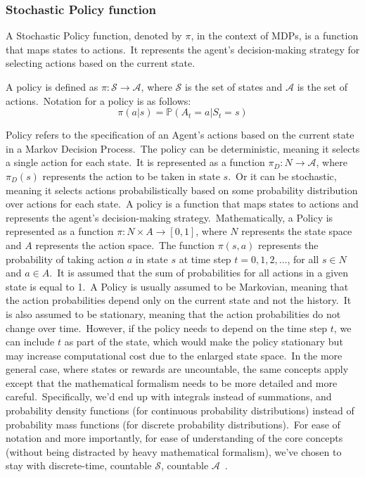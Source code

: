 \documentclass[../xlapes02]{subfiles}
\begin{document}
    \subsubsection{Stochastic Policy function}\label{subsubsec:policy}
    A Stochastic Policy function, denoted by $\pi$, in the context of MDPs, is a function that maps states to actions.\ It represents the agent's decision-making strategy for selecting actions based on the current state.
    \begin{definition}
        A policy is defined as $\pi: \mathcal{S} \rightarrow \mathcal{A}$, where $\mathcal{S}$ is the set of states and $\mathcal{A}$ is the set of actions.\ Notation for a policy is as follows:
        \begin{equation}
            \label{eq:policy}
            \pi(a|s)=\mathbb{P}(A_t=a|S_t=s)
        \end{equation}
    \end{definition}
    Policy refers to the specification of an Agent's actions based on the current state in a Markov Decision Process.\ The policy can be deterministic, meaning it selects a single action for each state.\ It is represented as a function $\pi_D : N \rightarrow \mathcal{A}$, where $\pi_D(s)$ represents the action to be taken in state $s$.\ Or it can be stochastic, meaning it selects actions probabilistically based on some probability distribution over actions for each state.\ A policy is a function that maps states to actions and represents the agent's decision-making strategy.\ Mathematically, a Policy is represented as a function $\pi : N \times A \rightarrow [0, 1]$, where $N$ represents the state space and $A$ represents the action space.\ The function $\pi(s, a)$ represents the probability of taking action $a$ in state $s$ at time step $t = 0, 1, 2, \ldots$, for all $s \in N$ and $a \in A$.\ It is assumed that the sum of probabilities for all actions in a given state is equal to 1.\ A Policy is usually assumed to be Markovian, meaning that the action probabilities depend only on the current state and not the history.\ It is also assumed to be stationary, meaning that the action probabilities do not change over time.\ However, if the policy needs to depend on the time step $t$, we can include $t$ as part of the state, which would make the policy stationary but may increase computational cost due to the enlarged state space.\ In the more general case, where states or rewards are uncountable, the same concepts apply except that the mathematical formalism needs to be more detailed and more careful.\ Specifically, we'd end up with integrals instead of summations, and probability density functions (for continuous probability distributions) instead of probability mass functions (for discrete probability distributions).\ For ease of notation and more importantly, for ease of understanding of the core concepts (without being distracted by heavy mathematical formalism), we've chosen to stay with discrete-time, countable $\mathcal{S}$, countable $\mathcal{A}$~\cite{rao2022foundations}.
\end{document}
